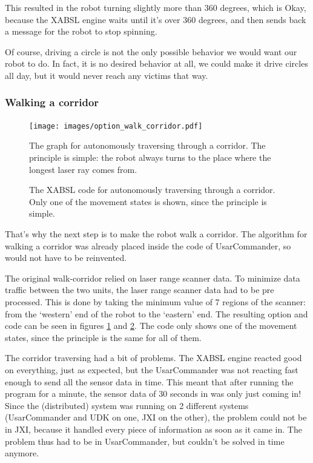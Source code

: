 \documentclass[a4paper,10pt]{article}
\begin{document}
This resulted in the robot turning slightly more than 360 degrees, which is
Okay, because the XABSL engine waits until it's over 360 degrees, and then sends
back a message for the robot to stop spinning. 

Of course, driving a circle is not the only possible behavior we would want our
robot to do. In fact, it is no desired behavior at all, we could make it drive
circles all day, but it would never reach any victims that way. 

\subsubsection{Walking a corridor}
\begin{figure}
\centering
\texttt{[image: images/option\_walk\_corridor.pdf]}\\
\caption{The graph for autonomously traversing through a corridor. The
principle is simple: the robot always turns to the place where the longest laser
ray comes from.}
\label{fig:walk-corridor-fig}
\end{figure}
\begin{figure}
\centering
{}
\parbox{1.1\linewidth}{
}
\caption{The XABSL code for autonomously traversing through a corridor. Only one
of the movement states is shown, since the principle is simple.}
\label{fig:walk-corridor-code}
\end{figure}

That's why the next step is to make the robot walk a corridor. The algorithm for
walking a corridor was already placed inside the code of UsarCommander, so
would not have to be reinvented. 

The original walk-corridor relied on laser range scanner data. To minimize data
traffic between the two units, the laser range scanner data had to be pre
processed. This is done by taking the minimum value of 7 regions of the scanner:
from the `western' end of the robot to the `eastern' end. The resulting option
and code can be seen in figures \ref{fig:walk-corridor-fig} and
\ref{fig:walk-corridor-code}. The code only shows one
of the movement states, since the principle is the same for all of them. 

The corridor traversing had a bit of problems. The XABSL engine reacted good on
everything, just as expected, but the UsarCommander was not reacting fast enough
to send all the sensor data in time. This meant that after running the program
for a minute, the sensor data of 30 seconds in was only just coming in! Since
the (distributed) system was running on 2 different systems (UsarCommander and
UDK on one, JXI on the other), the problem could not be in JXI, because it
handled every piece of information as soon as it came in. The problem thus had
to be in UsarCommander, but couldn't be solved in time anymore.
\end{document}
